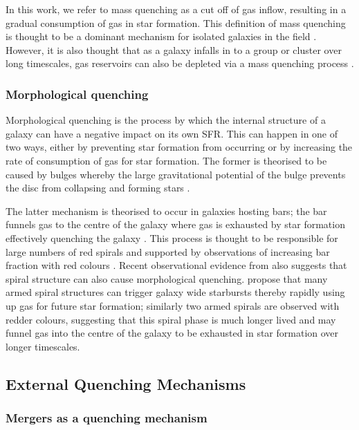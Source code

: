 \documentclass[useAMS,usenatbib]{mn2e}
\begin{document}
In this work, we refer to mass quenching as a cut off of gas inflow, resulting in a gradual consumption of gas in star formation. This definition of mass quenching is thought to be a dominant mechanism for isolated galaxies in the field \citep{kormendy04}. However, it is also thought that as a galaxy infalls in to a group or cluster over long timescales, gas reservoirs can also be depleted via a mass quenching process \citep{peng12}. 

 
\subsubsection{Morphological quenching}\label{sec:morphquench}

Morphological quenching is the process by which the internal structure of a galaxy can have a negative impact on its own SFR. This can happen in one of two ways, either by preventing star formation from occurring or by increasing the rate of consumption of gas for star formation. The former is theorised to be caused by bulges \citep{bluck14} whereby the large gravitational potential of the bulge prevents the disc from collapsing and forming stars \citep{Fang13}. 

The latter mechanism is theorised to occur in galaxies hosting bars; the bar funnels gas to the centre of the galaxy \citep{athanassoula92a} where gas is exhausted by star formation effectively quenching the galaxy \citep{zurita04, sheth05}. This process is thought to be responsible for large numbers of red spirals and supported by observations of increasing bar fraction with red colours \citep{masters11a}. Recent observational evidence from \cite{hart16} also suggests that spiral structure can also cause morphological quenching. \citeauthor{hart16} propose that many armed spiral structures can trigger galaxy wide starbursts thereby rapidly using up gas for future star formation; similarly two armed spirals are observed with redder colours, suggesting that this spiral phase is much longer lived and may funnel gas into the centre of the galaxy to be exhausted in star formation over longer timescales.  
 
\subsection{External Quenching Mechanisms}\label{sec:extquench}

\subsubsection{Mergers as a quenching mechanism}\label{sec:mergersquench}
\end{document}
